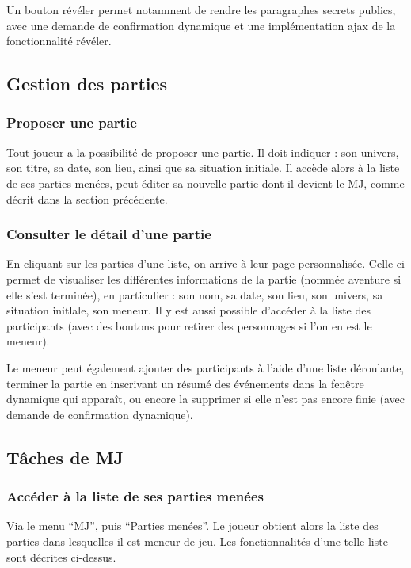 \documentclass[a4paper, 11pt, titlepage]{article}
\begin{document}
Un bouton révéler permet notamment de rendre les paragraphes secrets publics, avec une demande de confirmation dynamique et une implémentation {\sc ajax} de la fonctionnalité révéler.


\subsection {Gestion des parties}

\subsubsection {Proposer une partie}

Tout joueur a la possibilité de proposer une partie. Il doit indiquer : son univers, son titre, sa date, son lieu, ainsi que sa situation initiale. Il accède alors à la liste de ses parties menées, peut éditer sa nouvelle partie dont il devient le MJ, comme décrit dans la section précédente.

\subsubsection {Consulter le détail d'une partie}

En cliquant sur les parties d'une liste, on arrive à leur page personnalisée. Celle-ci permet de visualiser les différentes informations de la partie (nommée aventure si elle s'est terminée), en particulier : son nom, sa date, son lieu, son univers, sa situation initlale, son meneur. Il y est aussi possible d'accéder à la liste des participants (avec des boutons pour retirer des personnages si l'on en est le meneur).

Le meneur peut également ajouter des participants à l'aide d'une liste déroulante, terminer la partie en inscrivant un résumé des événements dans la fenêtre dynamique qui apparaît, ou encore la supprimer si elle n'est pas encore finie (avec demande de confirmation dynamique).


\subsection {Tâches de MJ}

\subsubsection {Accéder à la liste de ses parties menées}

Via le menu “MJ”, puis “Parties menées”. Le joueur obtient alors la liste des parties dans lesquelles il est meneur de jeu. Les fonctionnalités d’une telle liste sont décrites ci-dessus.
\end{document}
